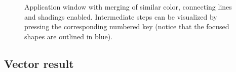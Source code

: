 \documentclass[]{usiinfbachelorproject}
\begin{document}
\begin{figure}[ht!]
{		\label{fig:interstep9}
	}
	\caption{Application window with merging of similar color, connecting lines and shadings enabled. Intermediate steps can be visualized by pressing the corresponding numbered key (notice that the focused shapes are outlined in blue).}
	\label{fig:intersteps}
\end{figure}



\subsection{Vector result} \label{sec:result}
\end{document}
